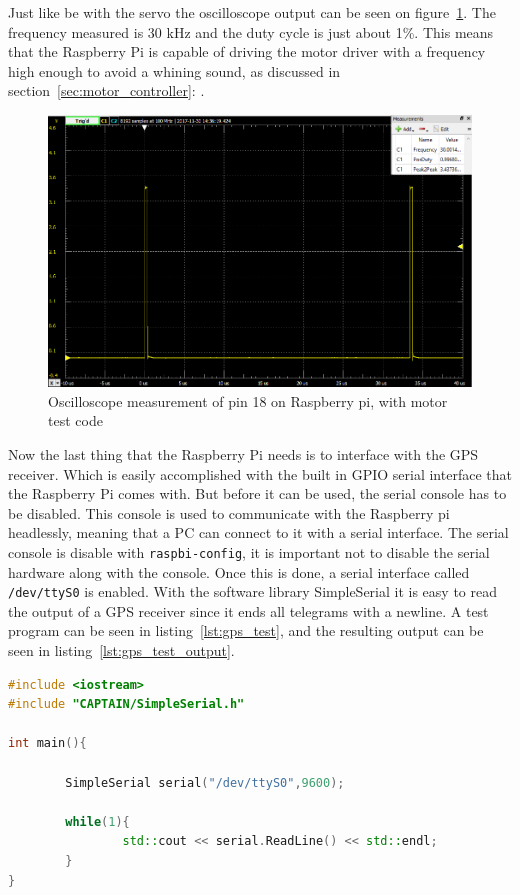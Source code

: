 Just like be with the servo the oscilloscope output can be seen on figure~\ref{fig:rpi_motor_pwm}. The frequency measured is 30 kHz and the duty cycle is just about 1\%. This means that the Raspberry Pi is capable of driving the motor driver with a frequency high enough to avoid a whining sound, as discussed in section~\ref{sec:motor_controller}: .

\begin{figure}[H]
\centering
\includegraphics[width=0.7\linewidth]{Images/Implementation/RPI_motor_PWM}
\caption{Oscilloscope measurement of pin 18 on Raspberry pi, with motor test code}
\label{fig:rpi_motor_pwm}
\end{figure}


Now the last thing that the Raspberry Pi needs is to interface with the GPS receiver. Which is easily accomplished with the built in GPIO serial interface that the Raspberry Pi comes with. But before it can be used, the serial console has to be disabled. This console is used to communicate with the Raspberry pi headlessly, meaning that a PC can connect to it with a serial interface. The serial console is disable with \texttt{raspbi-config}, it is important not to disable the serial hardware along with the console. Once this is done, a serial interface called \texttt{/dev/ttyS0} is enabled. With the software library SimpleSerial\cite{simple_serial} it is easy to read the output of a GPS receiver since it ends all telegrams with a newline. A test program can be seen in listing~\ref{lst:gps_test}, and the resulting output can be seen in listing~\ref{lst:gps_test_output}. 


\begin{lstlisting}[caption = {Test code to make the Raspberry Pi output GPS receiver telegrams}, captionpos=b, label={lst:gps_test}, 
language=C++,firstnumber=1]
#include <iostream>
#include "CAPTAIN/SimpleSerial.h"

int main(){

        SimpleSerial serial("/dev/ttyS0",9600);

        while(1){
                std::cout << serial.ReadLine() << std::endl;
        }
}

\end{lstlisting}


